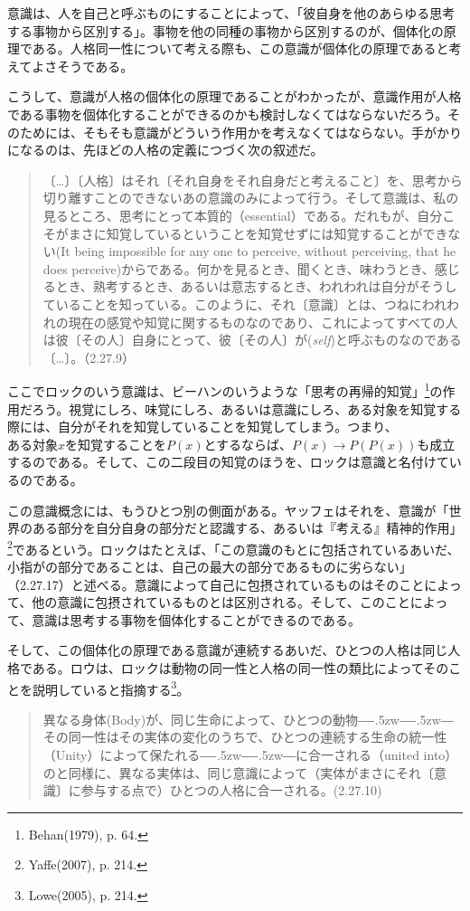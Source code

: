 \documentclass[a4j,oneside]{jsbook}
\def\――{―\kern-.5zw―\kern-.5zw―}
\begin{document}
意識は、人を自己と呼ぶものにすることによって、「彼自身を他のあらゆる思考する事物から区別する」。事物を他の同種の事物から区別するのが、個体化の原理である。人格同一性について考える際も、この意識が個体化の原理であると考えてよさそうである。
\par
こうして、意識が人格の個体化の原理であることがわかったが、意識作用が人格である事物を個体化することができるのかも検討しなくてはならないだろう。そのためには、そもそも意識がどういう作用かを考えなくてはならない。手がかりになるのは、先ほどの人格の定義につづく次の叙述だ。
\begin{quote}
〔…〕〔人格〕はそれ〔それ自身をそれ自身だと考えること〕を、思考から切り離すことのできないあの意識のみによって行う。そして意識は、私の見るところ、思考にとって本質的（essential）である。だれもが、自分こそがまさに知覚しているということを知覚せずには知覚することができない(It being impossible for any one to perceive, without perceiving, that he does perceive)からである。何かを見るとき、聞くとき、味わうとき、感じるとき、熟考するとき、あるいは意志するとき、われわれは自分がそうしていることを知っている。このように、それ〔意識〕とは、つねにわれわれの現在の感覚や知覚に関するものなのであり、これによってすべての人は彼〔その人〕自身にとって、彼〔その人〕が({\itshape self})と呼ぶものなのである〔…〕。（2.27.9）
\end{quote}
ここでロックのいう意識は、ビーハンのいうような「思考の再帰的知覚」\footnote{Behan(1979), p. 64.}の作用だろう。視覚にしろ、味覚にしろ、あるいは意識にしろ、ある対象を知覚する際には、自分がそれを知覚していることを知覚してしまう。つまり、$ある対象xを知覚することをP(x)$とするならば、$P(x)→P(P(x))$も成立するのである。そして、この二段目の知覚のほうを、ロックは意識と名付けているのである。
\par
この意識概念には、もうひとつ別の側面がある。ヤッフェはそれを、意識が「世界のある部分を自分自身の部分だと認識する、あるいは『考える』精神的作用」\footnote{Yaffe(2007), p. 214.}であるという。ロックはたとえば、「この意識のもとに包括されているあいだ、小指がの部分であることは、自己の最大の部分であるものに劣らない」（2.27.17）と述べる。意識によって自己に包摂されているものはそのことによって、他の意識に包摂されているものとは区別される。そして、このことによって、意識は思考する事物を個体化することができるのである。
\par
そして、この個体化の原理である意識が連続するあいだ、ひとつの人格は同じ人格である。ロウは、ロックは動物の同一性と人格の同一性の類比によってそのことを説明していると指摘する\footnote{Lowe(2005), p. 214.}。
\begin{quote}
異なる身体(Body)が、同じ生命によって、ひとつの動物\――その同一性はその実体の変化のうちで、ひとつの連続する生命の統一性（Unity）によって保たれる\――に合一される（united into）のと同様に、異なる実体は、同じ意識によって（実体がまさにそれ〔意識〕に参与する点で）ひとつの人格に合一される。(2.27.10)
\end{quote}
\end{document}

